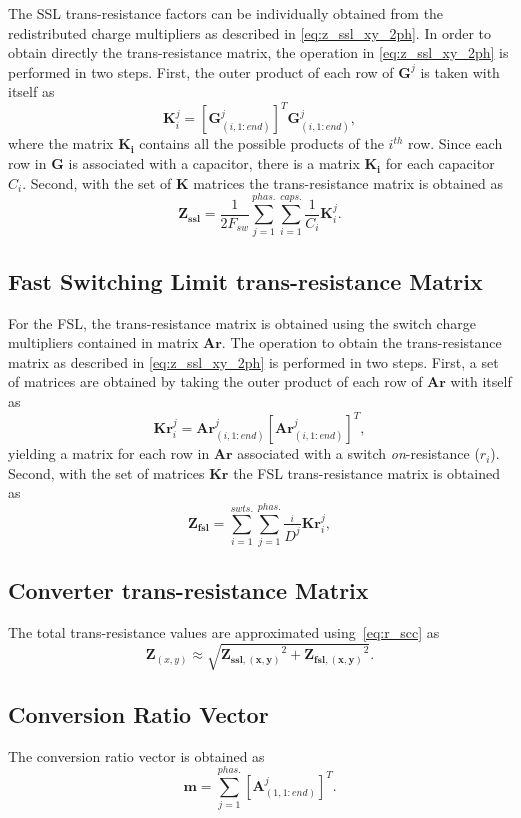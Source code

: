 The SSL trans-resistance factors can be individually obtained from the redistributed charge multipliers as described in \eqref{eq:z_ssl_xy_2ph}. In order to obtain directly the trans-resistance matrix, the operation in \eqref{eq:z_ssl_xy_2ph} is performed in  two steps. First, the outer product of  each row of $\mathbf{G}^j$ is taken with itself as
\begin{equation}
 \mathbf{K}_i^j =[\mathbf{G}_{(i,1:end)}^j ]^T \mathbf{G}_{(i,1:end)}^j ,
 \label{eq:K_matrix}
\end{equation}
where the matrix $\mathbf{K_i}$ contains all the possible products of the  $i^{th}$ row. Since each row in $\mathbf{G}$ is associated with a capacitor, there is a matrix $\mathbf{K_i}$ for each capacitor $C_i$.
Second, with the set of $\mathbf{K}$ matrices the trans-resistance matrix is obtained as
\begin{equation}
 \mathbf{Z_{ssl}} = \frac{1}{2 F_{sw}} \sum_{j=1}^{phas.} \sum_{i=1}^{caps.} \frac{1}{C_i} \mathbf{K}_i^j.
 \label{eq:G_ssl}
\end{equation}

\subsection{Fast Switching Limit trans-resistance Matrix}
For the FSL, the trans-resistance matrix is obtained using the switch charge multipliers
contained in matrix $\mathbf{Ar}$. The operation to obtain the trans-resistance matrix as described
in \eqref{eq:z_ssl_xy_2ph} is performed in two steps. First, a set of matrices are obtained by taking the outer product
of each row of $\mathbf{Ar}$ with itself as
\begin{equation}
 \mathbf{Kr}_i^j = \mathbf{Ar}_{(i,1:end)}^j [\mathbf{Ar}_{(i,1:end)}^j]^T,
 \label{eq:Kr_matrix}
\end{equation}
yielding a matrix for each row in $\mathbf{Ar}$ associated with a switch \emph{on}-resistance ($r_{i}$). Second, with the set of matrices $\mathbf{Kr}$ the FSL trans-resistance matrix is obtained as
\begin{equation}
 \mathbf{Z_{fsl}} =  \sum_{i=1}^{swts.} \sum_{j=1}^{phas.} \frac{_{i}}{D^j}
\mathbf{Kr}_i^j,
 \label{eq:G_fsl}
\end{equation}

\subsection{Converter trans-resistance Matrix}
The total trans-resistance values are approximated using~\eqref{eq:r_scc} as
\begin{equation}
 \mathbf{Z}_{(x,y)} \approx \sqrt{\mathbf{Z_{ssl,(x,y)}}^2 + \mathbf{Z_{fsl,(x,y)}}^2}.
 \label{eq:G_total}
\end{equation}

\subsection{Conversion Ratio Vector }

The conversion ratio vector is obtained as
\begin{equation}
 \mathbf{m} = \sum_{j=1}^{phas.}[\mathbf{A}^j_{(1,1:end)}]^T.
 \label{eq:m_equation}
\end{equation}

